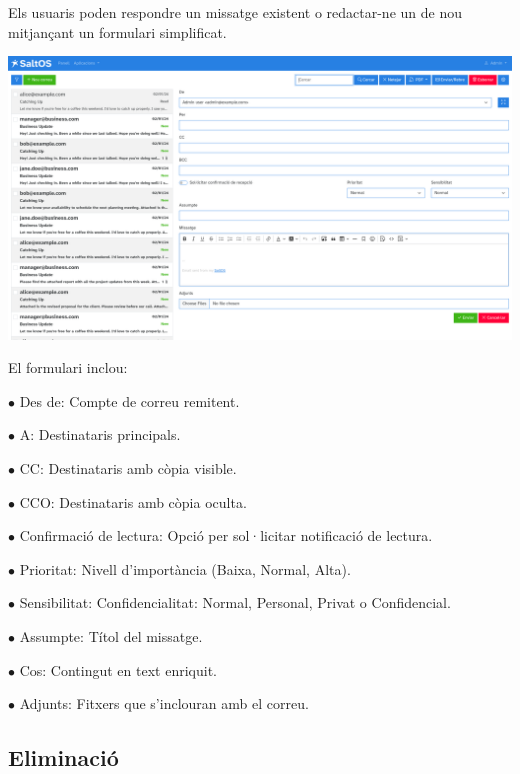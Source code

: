\documentclass[a4paper]{article}
\begin{document}
Els usuaris poden respondre un missatge existent o redactar-ne un de nou mitjançant un formulari simplificat.

\begin{center}\includegraphics[width=1\textwidth]{../ujest/snaps/test-screenshots-js-screenshots-emails-emails-create-ca-es-1-snap.png}\end{center}

El formulari inclou:

\begin{compactitem}
\item[\color{myblue}$\bullet$] Des de: Compte de correu remitent.
\item[\color{myblue}$\bullet$] A: Destinataris principals.
\item[\color{myblue}$\bullet$] CC: Destinataris amb còpia visible.
\item[\color{myblue}$\bullet$] CCO: Destinataris amb còpia oculta.
\item[\color{myblue}$\bullet$] Confirmació de lectura: Opció per sol·licitar notificació de lectura.
\item[\color{myblue}$\bullet$] Prioritat: Nivell d'importància (Baixa, Normal, Alta).
\item[\color{myblue}$\bullet$] Sensibilitat: Confidencialitat: Normal, Personal, Privat o Confidencial.
\item[\color{myblue}$\bullet$] Assumpte: Títol del missatge.
\item[\color{myblue}$\bullet$] Cos: Contingut en text enriquit.
\item[\color{myblue}$\bullet$] Adjunts: Fitxers que s'inclouran amb el correu.
\end{compactitem}

\hypertarget{toc95}{}
\subsection{Eliminació}
\end{document}
